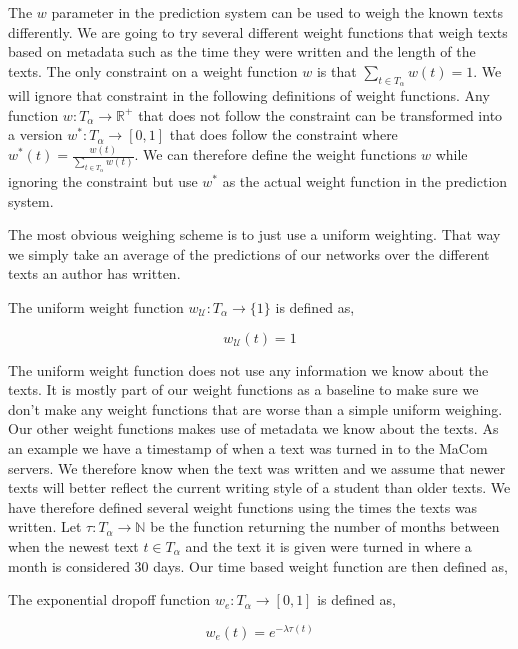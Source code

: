 The $w$ parameter in the prediction system can be used to weigh the known texts
differently. We are going to try several different weight functions that weigh
texts based on metadata such as the time they were written and the length of
the texts. The only constraint on a weight function $w$ is that $\sum_{t \in
T_\alpha} w(t) = 1$. We will ignore that constraint in the following definitions
of weight functions. Any function $w: T_\alpha \rightarrow \mathbb{R}^+$ that
does not follow the constraint can be transformed into a version
$w^*: T_\alpha \rightarrow [0,1]$ that does follow the constraint where
$w^*(t) = \frac{w(t)}{\sum_{t \in T_\alpha} w(t)}$. We can therefore define the
weight functions $w$ while ignoring the constraint but use $w^*$ as the actual
weight function in the prediction system.

The most obvious weighing scheme is to just use a uniform
weighting. That way we simply take an average of the predictions of our networks
over the different texts an author has written.

\begin{definition}

    The uniform weight function $w_\mathcal{U}: T_\alpha \rightarrow \{1\}$ is
    defined as,

    \begin{equation}
        w_\mathcal{U}(t) = 1
    \end{equation}

\end{definition}

The uniform weight function does not use any information we know about the
texts. It is mostly part of our weight functions as a baseline to make sure we
don't make any weight functions that are worse than a simple uniform weighing.
Our other weight functions makes use of metadata we know about the texts. As an
example we have a timestamp of when a text was turned in to the MaCom servers.
We therefore know when the text was written and we assume that newer texts will
better reflect the current writing style of a student than older texts. We
have therefore defined several weight functions using the times the texts was
written. Let $\tau: T_\alpha \rightarrow \mathbb{N}$ be the function returning
the number of months between when the newest text $t \in T_\alpha$ and the text
it is given were turned in where a month is considered 30 days. Our time based
weight function are then defined as,

\begin{definition}

    The exponential dropoff function $w_e: T_\alpha \rightarrow [0, 1]$ is
    defined as,

    \begin{equation}
        w_e(t) = e^{-\lambda \tau(t)}
    \end{equation}

\end{definition}

